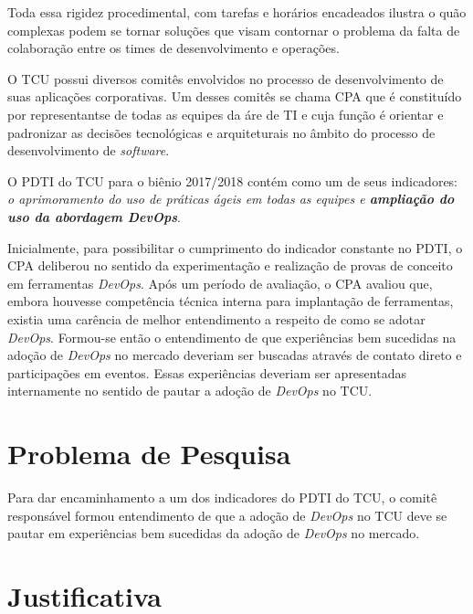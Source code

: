 Toda essa rigidez procedimental, com tarefas e horários encadeados ilustra o
quão complexas podem se tornar soluções que visam contornar o problema da falta
de colaboração entre os times de desenvolvimento e operações.

O \acrshort{TCU} possui diversos comitês envolvidos no processo de desenvolvimento
de suas aplicações corporativas. Um desses comitês se chama \acrfull{CPA} que é
constituído por representantse de todas as equipes da áre de \acrshort{TI} e cuja
função é orientar e padronizar as decisões tecnológicas e arquiteturais no
âmbito do processo de desenvolvimento de \textit{software}.

O \acrfull{PDTI} do \acrshort{TCU} para o biênio 2017/2018 contém como um de seus
indicadores: \emph{o aprimoramento do uso de práticas ágeis em todas as equipes
e \textbf{ampliação do uso da abordagem DevOps}}.

Inicialmente, para possibilitar o cumprimento do indicador constante no
\acrshort{PDTI}, o \acrshort{CPA} deliberou no sentido da experimentação e
realização de provas de conceito em ferramentas \textit{DevOps}. Após um
período de avaliação, o \acrshort{CPA} avaliou que, embora
houvesse competência técnica interna para implantação de ferramentas, existia
uma carência de melhor entendimento a respeito de como se adotar \textit{DevOps}.
Formou-se então o entendimento de que experiências bem sucedidas na adoção de
\textit{DevOps} no mercado deveriam ser buscadas através de contato direto
e participações em eventos. Essas experiências deveriam ser apresentadas
internamente no sentido de pautar a adoção de \textit{DevOps} no \acrshort{TCU}.

\section{Problema de Pesquisa}%

Para dar encaminhamento a um dos indicadores do \acrshort{PDTI} do \acrshort{TCU},
o comitê responsável formou entendimento de que a adoção de \textit{DevOps} no
\acrshort{TCU} deve se pautar em experiências bem sucedidas da adoção de
\textit{DevOps} no mercado.

\section{Justificativa}%

